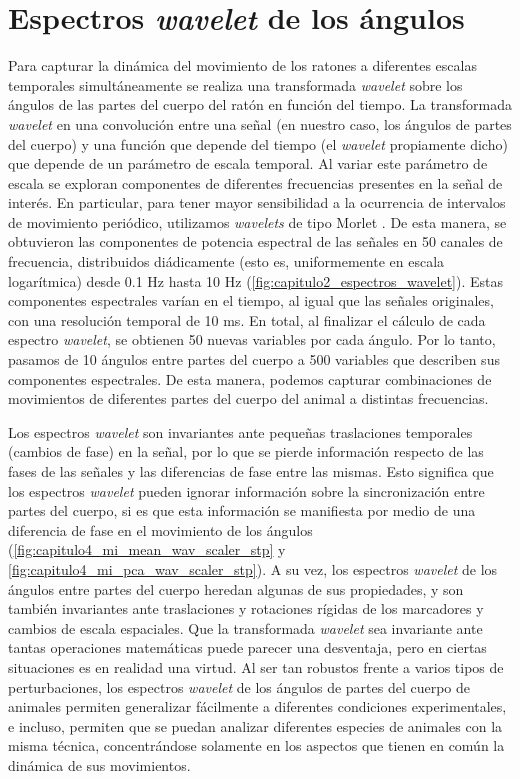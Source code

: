 \section{Espectros \textit{wavelet} de los ángulos}\label{sec:espectros_wavelet}

Para capturar la dinámica del movimiento de los ratones a diferentes escalas temporales simultáneamente se realiza una transformada \textit{wavelet} sobre los ángulos de las partes del cuerpo del ratón en función del tiempo. La transformada \textit{wavelet} en una convolución entre una señal (en nuestro caso, los ángulos de partes del cuerpo) y una función que depende del tiempo (el \textit{wavelet} propiamente dicho) que depende de un parámetro de escala temporal.  Al variar este parámetro de escala se exploran componentes de diferentes frecuencias presentes en la señal de interés. En particular, para tener mayor sensibilidad a la ocurrencia de intervalos de movimiento periódico, utilizamos \textit{wavelets} de tipo Morlet \cite{berman_mapping}. De esta manera, se obtuvieron las componentes de potencia espectral de las señales en 50 canales de frecuencia, distribuidos diádicamente (esto es, uniformemente en escala logarítmica) desde 0.1 Hz hasta 10 Hz (\autoref{fig:capitulo2_espectros_wavelet}). Estas componentes espectrales varían en el tiempo, al igual que las señales originales, con una resolución temporal de 10 ms. En total, al finalizar el cálculo de cada espectro \textit{wavelet}, se obtienen 50 nuevas variables por cada ángulo. Por lo tanto, pasamos de 10 ángulos entre partes del cuerpo a 500 variables que describen sus componentes espectrales. De esta manera, podemos capturar combinaciones de movimientos de diferentes partes del cuerpo del animal a distintas frecuencias.

Los espectros \textit{wavelet} son invariantes ante pequeñas traslaciones temporales (cambios de fase) en la señal, por lo que se pierde información respecto de las fases de las señales y las diferencias de fase entre las mismas. Esto significa que los espectros \textit{wavelet} pueden ignorar información sobre la sincronización entre partes del cuerpo, si es que esta información se manifiesta por medio de una diferencia de fase en el movimiento de los ángulos (\autoref{fig:capitulo4_mi_mean_wav_scaler_stp} y \autoref{fig:capitulo4_mi_pca_wav_scaler_stp}). A su vez, los espectros \textit{wavelet} de los ángulos entre partes del cuerpo heredan algunas de sus propiedades, y son también invariantes ante traslaciones y rotaciones rígidas de los marcadores y cambios de escala espaciales. Que la transformada \textit{wavelet} sea invariante ante tantas operaciones matemáticas puede parecer una desventaja, pero en ciertas situaciones es en realidad una virtud. Al ser tan robustos frente a varios tipos de perturbaciones, los espectros \textit{wavelet} de los ángulos de partes del cuerpo de animales permiten generalizar fácilmente a diferentes condiciones experimentales, e incluso, permiten que se puedan analizar diferentes especies de animales con la misma técnica, concentrándose solamente en los aspectos que tienen en común la dinámica de sus movimientos.

